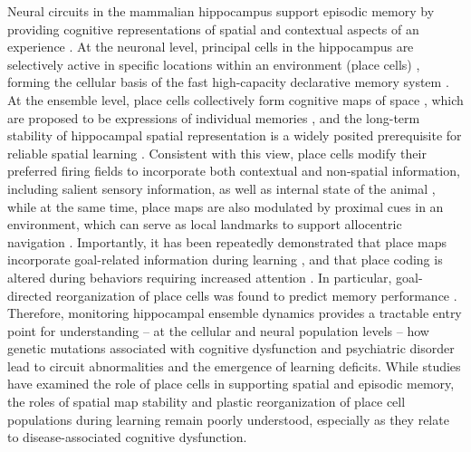 Neural circuits in the mammalian hippocampus support episodic memory by providing cognitive representations of spatial and contextual aspects of an experience \citep{Burgess2002}\citep{Buzsaki2013}\citep{Eichenbaum2000}\citep{O'Keefe1971}. At the neuronal level, principal cells in the hippocampus are selectively active in specific locations within an environment (place cells) \citep{O'Keefe1971}, forming the cellular basis of the fast high-capacity declarative memory system \citep{Buzsaki2013}. At the ensemble level, place cells collectively form cognitive maps of space \citep{Hartley2014}\citep{Leutgeb2005c}\citep{O'Keefe1971}\citep{OKeefe1978}\citep{Moser2015}, which are proposed to be expressions of individual memories \citep{Moser2015}\citep{Buzsaki2013}, and the long-term stability of hippocampal spatial representation is a widely posited prerequisite for reliable spatial learning \citep{Kentros2004}\citep{Lever2002b}\citep{Mankin2012}\citep{Thompson1990}\citep{Ziv2013}. Consistent with this view, place cells modify their preferred firing fields to incorporate both contextual \citep{Colgin2008}\citep{Karlsson2008}\citep{Leutgeb2005a}\citep{Leutgeb2004}\citep{Muller1987b}\citep{Wilson1994} and non-spatial information, including salient sensory information, as well as internal state of the animal \citep{Frank2000}\citep{Kobayashi1997}\citep{Moita2004}\citep{Pastalkova2008}\citep{Wood1999}, while at the same time, place maps are also modulated by proximal cues in an environment, which can serve as local landmarks to support allocentric navigation \citep{Deshmukh2013}\citep{Knierim2011}\citep{Knierim2003}. Importantly, it has been repeatedly demonstrated that place maps incorporate goal-related information during learning \citep{Breese1989}\citep{Fyhn2002}\citep{Dupret2010a}\citep{Gothard1996}\citep{Hok2007}\citep{Hollup2001b}\citep{Kobayashi1997}, and that place coding is altered during behaviors requiring increased attention \citep{Kentros2004}\citep{Markus1995}\citep{Muzzio2009a}. In particular, goal-directed reorganization of place cells was found to predict  memory  performance \citep{Dupret2010a}. Therefore, monitoring hippocampal ensemble dynamics provides a tractable entry point for understanding – at the cellular and neural population levels – how genetic mutations associated with cognitive dysfunction and psychiatric disorder lead to circuit abnormalities and the emergence of learning deficits.  While studies have examined the role of place cells in supporting spatial and episodic memory, the roles of spatial map stability and plastic reorganization of place cell populations during learning remain poorly understood, especially as they relate to disease-associated cognitive dysfunction. 

